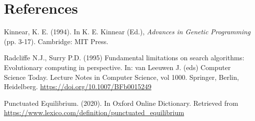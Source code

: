 \documentclass[11pt]{article}
\begin{document}

\restoregeometry

\pagebreak
\section*{References}
\label{sec:org9dc046e}
\doublespacing

Kinnear, K. E. (1994). In K. E. Kinnear (Ed.), \emph{Advances in
Genetic Programming} (pp. 3-17). Cambridge: MIT Press.

Radcliffe N.J., Surry P.D. (1995) Fundamental limitations on search
algorithms: Evolutionary computing in perspective.  In: van Leeuwen
J. (eds) Computer Science Today. Lecture Notes in Computer Science,
vol 1000. Springer, Berlin, Heidelberg.
\url{https://doi.org/10.1007/BFb0015249}

Punctuated Equilibrium. (2020). In Oxford Online Dictionary. Retrieved
from \url{https://www.lexico.com/definition/punctuated_equilibrium}
\end{document}
